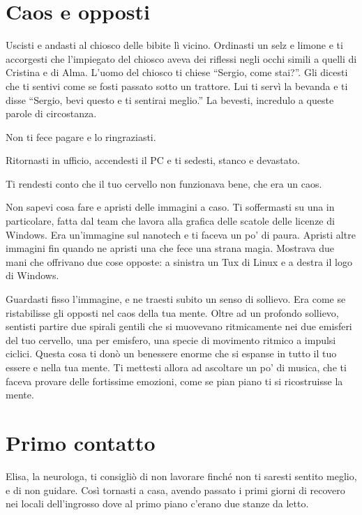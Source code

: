 \section{Caos e opposti}
\label{caos_e_opposti}

Uscisti e andasti al chiosco delle bibite lì vicino. Ordinasti un selz e limone e ti accorgesti che l'impiegato del chiosco aveva dei riflessi negli occhi simili a quelli di Cristina e di Alma. L'uomo del chiosco ti chiese “Sergio, come stai?”. Gli dicesti che ti sentivi come se fosti passato sotto un trattore. Lui ti servì la bevanda e ti disse “Sergio, bevi questo e ti sentirai meglio.” La bevesti, incredulo a queste parole di circostanza.

Non ti fece pagare e lo ringraziasti.

Ritornasti in ufficio, accendesti il PC e ti sedesti, stanco e devastato.

Ti rendesti conto che il tuo cervello non funzionava bene, che era un caos.

Non sapevi cosa fare e apristi delle immagini a caso. Ti soffermasti su una in particolare, fatta dal team che lavora alla grafica delle scatole delle licenze di Windows. Era un'immagine sul nanotech e ti faceva un po' di paura. Apristi altre immagini fin quando ne apristi una che fece una strana magia. Mostrava due mani che offrivano due cose opposte: a sinistra un Tux di Linux e a destra il logo di Windows.

Guardasti fisso l'immagine, e ne traesti subito un senso di sollievo. Era come se ristabilisse gli opposti nel caos della tua mente. Oltre ad un profondo sollievo, sentisti partire due spirali gentili che si muovevano ritmicamente nei due emisferi del tuo cervello, una per emisfero, una specie di movimento ritmico a impulsi ciclici. Questa cosa ti donò un benessere enorme che si espanse in tutto il tuo essere e nella tua mente. Ti mettesti allora ad ascoltare un po' di musica, che ti faceva provare delle fortissime emozioni, come se pian piano ti si ricostruisse la mente.

\section{Primo contatto}
\label{primo_contatto}

Elisa, la neurologa, ti consigliò di non lavorare finché non ti saresti sentito meglio, e di non guidare. Così tornasti a casa, avendo passato i primi giorni di recovero nei locali dell'ingrosso dove al primo piano c'erano due stanze da letto.

